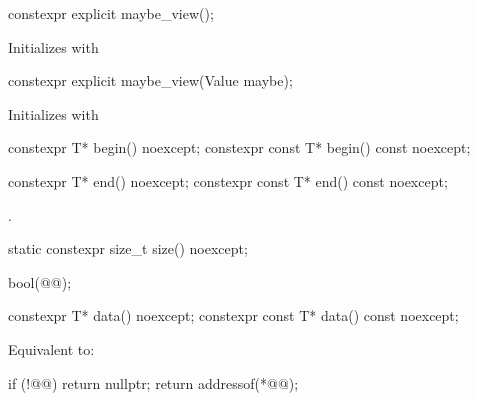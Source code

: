 \documentclass[a4paper,10pt,oneside,openany,final,article]{memoir}
\begin{document}
\begin{wording}
\begin{codeblock}
\end{codeblock}

\begin{itemdecl}
constexpr explicit maybe_view();
\end{itemdecl}
\begin{itemdescr}
\pnum{}
\effects{}
Initializes  with 
\end{itemdescr}

\begin{itemdecl}
constexpr explicit maybe_view(Value maybe);
\end{itemdecl}
\begin{itemdescr}
\pnum{}
\effects{}
Initializes  with 
\end{itemdescr}

\begin{itemdecl}
constexpr T* begin() noexcept;
constexpr const T* begin() const noexcept;
\end{itemdecl}

\begin{itemdescr}
\pnum
\returns
{}
\end{itemdescr}

\begin{itemdecl}
constexpr T* end() noexcept;
constexpr const T* end() const noexcept;
\end{itemdecl}

\begin{itemdescr}
\pnum{}
\returns {}.
\end{itemdescr}

\begin{itemdecl}
static constexpr size_t size() noexcept;
\end{itemdecl}

\begin{itemdescr}
\pnum{}
\returns
\begin{codeblock}
bool(@@);
\end{codeblock}
\end{itemdescr}

\begin{itemdecl}
constexpr T* data() noexcept;
constexpr const T* data() const noexcept;
\end{itemdecl}

\begin{itemdescr}
\pnum{}
\effects{}
Equivalent to:

\begin{codeblock}
if (!@@)
    return nullptr;
return addressof(*@@);


\end{codeblock}
\end{itemdescr}
\end{wording}
\end{document}
